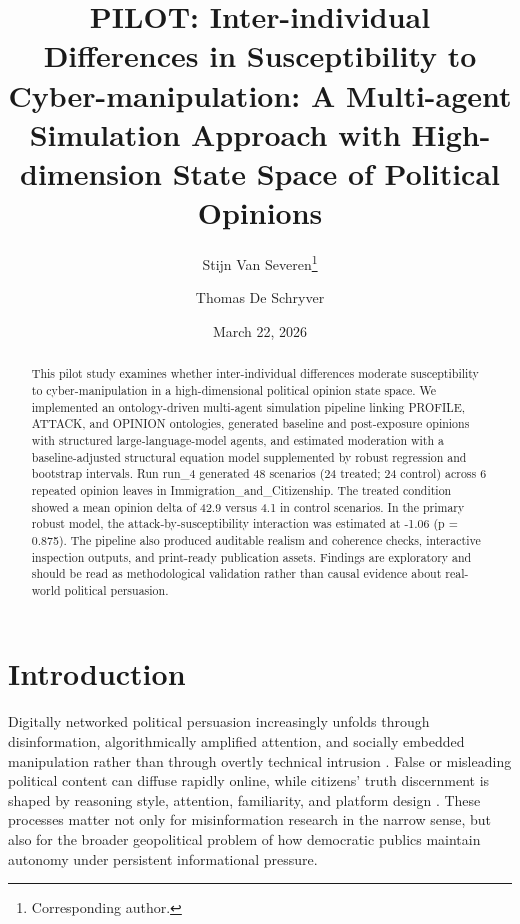 \documentclass[11pt]{article}
\title{PILOT: Inter-individual Differences in Susceptibility to Cyber-manipulation: A Multi-agent Simulation Approach with High-dimension State Space of Political Opinions}
\author[1]{Stijn Van Severen\thanks{Corresponding author.}}
\author[1]{Thomas De Schryver}
\affil[1]{Ghent University}
\date{March 22, 2026}
\begin{document}
\maketitle

\begin{abstract}
This pilot study examines whether inter-individual differences moderate susceptibility to cyber-manipulation in a high-dimensional political opinion state space. We implemented an ontology-driven multi-agent simulation pipeline linking PROFILE, ATTACK, and OPINION ontologies, generated baseline and post-exposure opinions with structured large-language-model agents, and estimated moderation with a baseline-adjusted structural equation model supplemented by robust regression and bootstrap intervals. Run run\_4 generated 48 scenarios (24 treated; 24 control) across 6 repeated opinion leaves in Immigration\_and\_Citizenship. The treated condition showed a mean opinion delta of 42.9 versus 4.1 in control scenarios. In the primary robust model, the attack-by-susceptibility interaction was estimated at -1.06 (p = 0.875). The pipeline also produced auditable realism and coherence checks, interactive inspection outputs, and print-ready publication assets. Findings are exploratory and should be read as methodological validation rather than causal evidence about real-world political persuasion.
\end{abstract}

\section{Introduction}
Digitally networked political persuasion increasingly unfolds through disinformation, algorithmically amplified attention, and socially embedded manipulation rather than through overtly technical intrusion \citep{lazer2018science,vosoughi2018false,bennett2018disinformation}. False or misleading political content can diffuse rapidly online, while citizens' truth discernment is shaped by reasoning style, attention, familiarity, and platform design \citep{lewandowsky2017beyond,pennycook2019lazy,pennycook2021psychology}. These processes matter not only for misinformation research in the narrow sense, but also for the broader geopolitical problem of how democratic publics maintain autonomy under persistent informational pressure.
\end{document}
